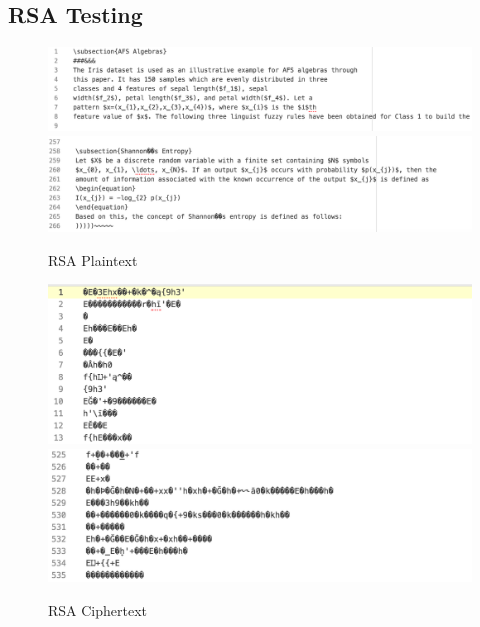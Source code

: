 \documentclass[]{article}
\begin{document}
\vspace*{-0.8cm}

\subsection*{RSA Testing}

\begin{figure}[H]
	\includegraphics[height=\textheight/6,width=\textwidth]{rsa_plain1.png}
	\includegraphics[height=\textheight/6,width=\textwidth]{rsa_plain2.png}	
	\caption{RSA Plaintext}
	\centering
\end{figure}

\begin{figure}[H]
	\includegraphics[width=\textwidth]{rsa_cipher1.png}
	\includegraphics[width=\textwidth]{rsa_cipher2.png}	
	\caption{RSA Ciphertext}
	\centering
\end{figure}
\end{document}
